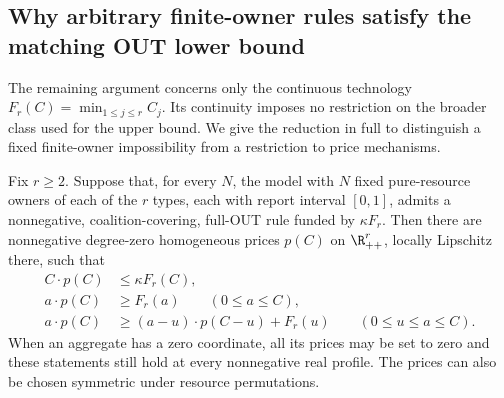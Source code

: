 \subsection{Why arbitrary finite-owner rules satisfy the matching OUT lower bound}

The remaining argument concerns only the continuous technology
$F_r(C)=\min_{1\le j\le r}C_j$. Its continuity imposes no restriction on
the broader class used for the upper bound. We give the reduction in full
to distinguish a fixed finite-owner impossibility from a restriction to
price mechanisms.

\begin{lemma}
\label{dim:price-reduction}
Fix $r\ge2$. Suppose that, for every $N$, the model with $N$ fixed
pure-resource owners of each of the $r$ types, each with report interval
$[0,1]$, admits a nonnegative, coalition-covering, full-OUT rule funded by
$\kappa F_r$. Then there are nonnegative degree-zero homogeneous prices $p(C)$ on
$\R_{++}^r$, locally Lipschitz there, such that
\begin{align}
 C\cdot p(C)&\le\kappa F_r(C),\label{dim:price-budget}\\
 a\cdot p(C)&\ge F_r(a)\qquad(0\le a\le C),
 \label{dim:price-coverage}\\
 a\cdot p(C)&\ge(a-u)\cdot p(C-u)+F_r(u)
 \qquad(0\le u\le a\le C).
 \label{dim:price-out}
\end{align}
When an aggregate has a zero coordinate, all its prices may be set to
zero and these statements still hold at every nonnegative real profile.
The prices can also be chosen symmetric under resource permutations.
\end{lemma}


